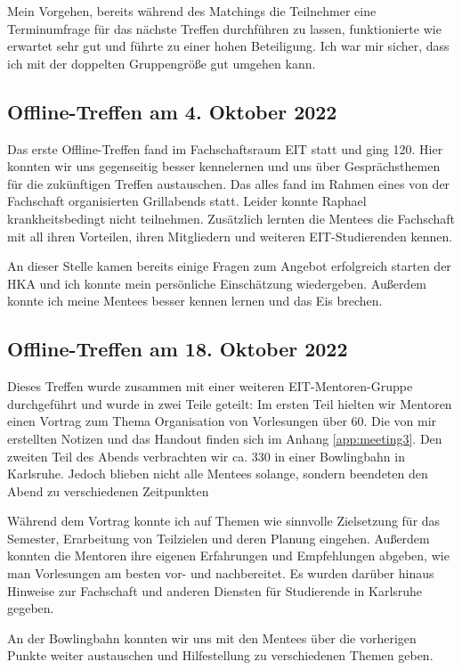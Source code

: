 \documentclass[
    paper=a4,
    div=calc,
    numbers=noendperiod,
]{scrartcl}
\newcommand{\gquotes}[1]{\glqq #1\grqq}
\begin{document}
        Mein Vorgehen, bereits während des Matchings die Teilnehmer eine Terminumfrage für das nächste Treffen durchführen zu lassen, funktionierte wie erwartet sehr gut und führte zu einer hohen Beteiligung. Ich war mir sicher, dass ich mit der doppelten Gruppengröße gut umgehen kann.

    \subsection{Offline-Treffen am 4. Oktober 2022}
        Das erste Offline-Treffen fand im Fachschaftsraum EIT statt und ging \SI{120}{\min}. Hier konnten wir uns gegenseitig besser kennelernen und uns über Gesprächsthemen für die zukünftigen Treffen austauschen. Das alles fand im Rahmen eines von der Fachschaft organisierten Grillabends statt. Leider konnte Raphael krankheitsbedingt nicht teilnehmen. Zusätzlich lernten die Mentees die Fachschaft mit all ihren Vorteilen, ihren Mitgliedern und weiteren EIT-Studierenden kennen.

        An dieser Stelle kamen bereits einige Fragen zum Angebot \gquotes{erfolgreich starten} der HKA und ich konnte mein persönliche Einschätzung wiedergeben. Außerdem konnte ich meine Mentees besser kennen lernen und das Eis brechen.

    \subsection{Offline-Treffen am 18. Oktober 2022}
        Dieses Treffen wurde zusammen mit einer weiteren EIT-Mentoren-Gruppe durchgeführt und wurde in zwei Teile geteilt: Im ersten Teil hielten wir Mentoren einen Vortrag zum Thema \gquotes{Organisation von Vorlesungen} über \SI{60}{\min}. Die von mir erstellten Notizen und das Handout finden sich im Anhang \ref{app:meeting3}. Den zweiten Teil des Abends verbrachten wir ca. \SI{330}{\min} in einer Bowlingbahn in Karlsruhe. Jedoch blieben nicht alle Mentees solange, sondern beendeten den Abend zu verschiedenen Zeitpunkten

        Während dem Vortrag konnte ich auf Themen wie sinnvolle Zielsetzung für das Semester, Erarbeitung von Teilzielen und deren Planung eingehen. Außerdem konnten die Mentoren ihre eigenen Erfahrungen und Empfehlungen abgeben, wie man Vorlesungen am besten vor- und nachbereitet. Es wurden darüber hinaus Hinweise zur Fachschaft und anderen Diensten für Studierende in Karlsruhe gegeben.

        An der Bowlingbahn konnten wir uns mit den Mentees über die vorherigen Punkte weiter austauschen und Hilfestellung zu verschiedenen Themen geben. 
\end{document}
